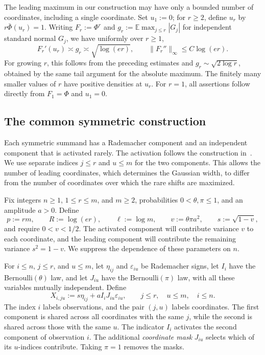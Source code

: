 \documentclass[11pt,letterpaper,twoside,leqno]{article}
\theoremstyle{bookplain}
\theoremstyle{bookremark}
\newcommand{\E}{\mathbb E}
\begin{document}
The leading maximum in our construction may have only a bounded
number of coordinates, including a single coordinate. Set $u_1:=0$;
for $r\ge2$, define $u_r$ by $r\bar\Phi(u_r)=1$.
Writing $F_r:=\Phi^r$ and
$g_r:=\E\max_{j\le r}|G_j|$ for independent standard normal
$G_j$, we have uniformly over $r\ge1$,
\begin{equation}
 F_r'(u_r)\asymp g_r\asymp\sqrt{\log(er)},\qquad
 \|F_r''\|_\infty\le C\log(er).
 \label{lower:eq:leading-density}
\end{equation}
For growing $r$, this follows from the preceding estimates and
$g_r\sim\sqrt{2\log r}$, obtained by the same tail argument
for the absolute maximum. The finitely many smaller values of
$r$ have positive densities at $u_r$. For $r=1$, all assertions
follow directly from $F_1=\Phi$ and $u_1=0$.

\subsection{The common symmetric construction}
\label{app:lower-family}

Each symmetric summand has a Rademacher component and an independent
component that is activated rarely. The activation follows the
construction in~\cite[Proposition~E.1]{FKLZ}. We use separate
indices $j\le r$ and $u\le m$ for the two components. This
allows the number of leading coordinates, which determines the
Gaussian width, to differ from the number of coordinates over
which the rare shifts are maximized.

Fix integers $n\ge1$, $1\le r\le m$, and $m\ge2$,
probabilities $0<\theta,\pi\le1$, and an amplitude $a>0$.
Define
\[
 p:=rm,\qquad R:=\log(er),\qquad \ell:=\log m,\qquad
 v:=\theta\pi a^2,\qquad s:=\sqrt{1-v},
\]
and require $0<v<1/2$. The activated component will contribute
variance $v$ to each coordinate, and the leading component will
contribute the remaining variance $s^2=1-v$. We suppress the
dependence of these parameters on $n$.

For $i\le n$, $j\le r$, and $u\le m$, let $\eta_{ij}$ and
$\varepsilon_{iu}$ be Rademacher signs, let $I_i$ have the
Bernoulli$(\theta)$ law, and let $J_{iu}$ have the
Bernoulli$(\pi)$ law, with all these variables mutually independent.
Define
\begin{equation}
 X_{i,ju}:=s\eta_{ij}+aI_iJ_{iu}\varepsilon_{iu},
 \qquad j\le r,\quad u\le m,\quad i\le n.
 \label{sym:eq:common-construction}
\end{equation}
The index $i$ labels observations, and the pair $(j,u)$ labels
coordinates. The first component is shared across all coordinates
with the same $j$, while the second is shared across those with
the same $u$. The indicator $I_i$ activates the second component
of observation $i$. The additional \emph{coordinate mask} $J_{iu}$
selects which of its $u$-indices contribute. Taking $\pi=1$
removes the masks.
\end{document}
